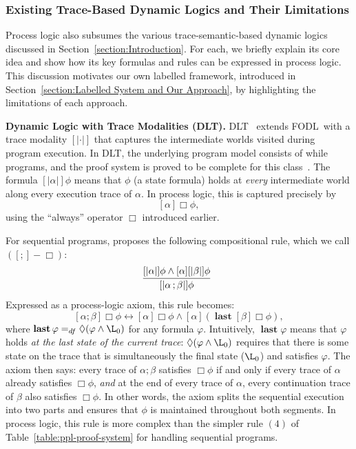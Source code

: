 \documentclass[manuscript,screen]{acmart}
\newcommand{\dddef}[0]{=_{df}}
\DeclareMathOperator{\seq}{;}
\DeclareMathOperator{\last}{\mathbf{last}}
\newcommand{\FODL}[0]{\mbox{FODL}}
\newcommand{\DLT}[0]{\mbox{DLT}}
\begin{document}
\subsubsection{Existing Trace-Based Dynamic Logics and Their Limitations}

Process logic also subsumes the various trace-semantic-based dynamic logics discussed in Section~\ref{section:Introduction}. For each, we briefly explain its core idea and show how its key formulas and rules can be expressed in process logic. This discussion motivates our own labelled framework, introduced in Section~\ref{section:Labelled System and Our Approach}, by highlighting the limitations of each approach. 

\textbf{Dynamic Logic with Trace Modalities (DLT).}  DLT~\cite{Beckert01} extends \FODL\ with a trace modality $[|\cdot|]$ that captures the intermediate worlds visited during program execution.  
In \DLT, the underlying program model consists of while programs, and the proof system is proved to be complete for this class~\cite{Beckert01}. 
The formula $[|\alpha|]\phi$ means that $\phi$ (a state formula) holds at \emph{every} intermediate world along every execution trace of $\alpha$.  In process logic, this is captured precisely by
$$
    [\alpha]\Box \phi,
$$
using the ``always'' operator $\Box$ introduced earlier.

For sequential programs, \cite{Beckert01} proposes the following compositional rule, which we call $([\seq]-\Box)$:
$$
\infer[]
{[|\alpha\seq\beta|]\phi}
{[|\alpha|]\phi\wedge [\alpha][|\beta|]\phi}
$$
Expressed as a process-logic axiom, this rule becomes:
$$
[\alpha\seq\beta]\Box\phi\leftrightarrow [\alpha]\Box\phi\wedge [\alpha](\last [\beta]\Box\phi), 
$$
where $\last \varphi\dddef \Diamond(\varphi\wedge \L_0)$ for any formula $\varphi$.  Intuitively, $\last\varphi$ means that $\varphi$ holds \emph{at the last state of the current trace}: $\Diamond(\varphi\wedge\L_0)$ requires that there is some state on the trace that is simultaneously the final state ($\L_0$) and satisfies $\varphi$.  The axiom then says: every trace of $\alpha\seq\beta$ satisfies $\Box\phi$ if and only if every trace of $\alpha$ already satisfies $\Box\phi$, \emph{and} at the end of every trace of $\alpha$, every continuation trace of $\beta$ also satisfies $\Box\phi$.  In other words, the axiom splits the sequential execution into two parts and ensures that $\phi$ is maintained throughout both segments.  In process logic, this rule is more complex than the simpler rule $(4)$ of Table~\ref{table:ppl-proof-system} for handling sequential programs.
\end{document}
